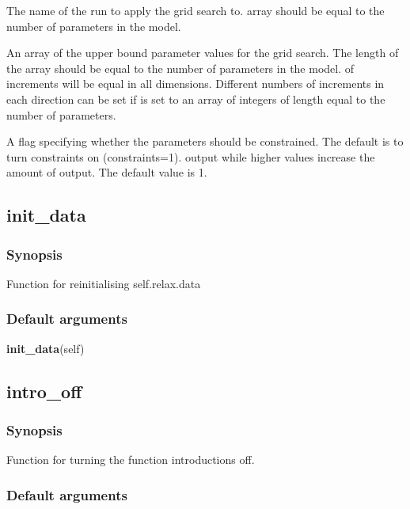   The name of the run to apply the grid search to.
array should be equal to the number of parameters in the model.

  An array of the upper bound parameter values for the grid search.  The length of the array should be equal to the number of parameters in the model.
of increments will be equal in all dimensions.  Different numbers of increments in each
direction can be set if 
 is set to an array of integers of length equal to the number
of parameters.

  A flag specifying whether the parameters should be constrained.  The default is to turn constraints on (constraints=1).
output while higher values increase the amount of output.  The default value is 1.


\newpage

\subsection{init\_data}


\subsubsection{Synopsis}

Function for reinitialising self.relax.data

\subsubsection{Default arguments}

\textsf{\textbf{init\_data}(self)}



\newpage

\subsection{intro\_off}


\subsubsection{Synopsis}

Function for turning the function introductions off.

\subsubsection{Default arguments}

